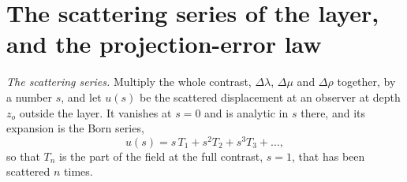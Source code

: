 \documentclass[11pt,a4paper]{article}
\begin{document}
\section{The scattering series of the layer, and the projection-error law}\label{app:borndefect}

\emph{The scattering series.} Multiply the whole contrast, $\Delta\lambda$, $\Delta\mu$ and
$\Delta\rho$ together, by a number $s$, and let $u(s)$ be the scattered displacement at an observer at
depth $z_o$ outside the layer. It vanishes at $s=0$ and is analytic in $s$ there, and its expansion is
the Born series,
\begin{equation}\label{eq:bornseries}
  u(s)=s\,T_1+s^2T_2+s^3T_3+\dots,
\end{equation}
so that $T_n$ is the part of the field at the full contrast, $s=1$, that has been scattered $n$ times.
\end{document}
